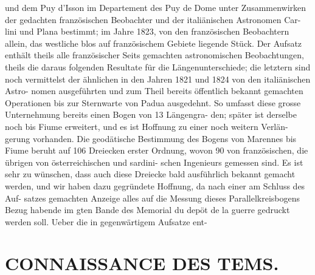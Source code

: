 \documentclass[12pt,a4paper]{article}
\begin{document}
{{{{{{{{und  dem  Puy  d'Isson  im  Departement  des  Puy  de  Dome unter  Zusammenwirken  der  gedachten  französischen  Beobachter  und  der  italiänischen  Astronomen  Car- lini und  Plana  bestimmt;  im  Jahre  1823,  von  den  französischen  Beobachtern  allein,  das  westliche  blos auf  französischem  Gebiete  liegende  Stück.  Der  Aufsatz  enthält  theils  alle  französischer  Seits  gemachten astronomischen  Beobachtungen,  theils  die  daraus  folgenden  Resultate  für  die  Längenunterschiede;  die letztern  sind  noch  vermittelst  der  ähnlichen  in  den  Jahren  1821  und  1824  von  den  italiänischen  Astro- nomen ausgeführten  und  zum  Theil  bereits  öffentlich  bekannt  gemachten  Operationen  bis  zur  Sternwarte von  Padua  ausgedehnt.  So  umfasst  diese  grosse  Unternehmung  bereits  einen  Bogen  von  13  Längengra- den; später  ist  derselbe  noch  bis  Fiume  erweitert,  und  es  ist  Hoffnung  zu  einer  noch  weitern  Verlän- gerung vorhanden.  Die  geodätische  Bestimmung  des  Bogens  von  Marennes  bis  Fiume  beruht  auf  106 Dreiecken  erster  Ordnung,  wovon  90  von  französischen,  die  übrigen  von  österreichischen  und  sardini- schen Ingenieurs  gemessen  sind.  Es  ist  sehr  zu  wünschen,  dass  auch  diese  Dreiecke  bald  ausführlich bekannt  gemacht  werden,  und  wir  haben  dazu  gegründete  Hoffnung,  da  nach  einer  am  Schluss  des  Auf- satzes gemachten  Anzeige  alles  auf  die  Messung  dieses  Parallelkreisbogens  Bezug  habende  im  gten  Bande des  Memorial  du  depöt  de  la  guerre  gedruckt  werden  soll.     Ueber  die  in  gegenwärtigem  Aufsatze  ent-


\section*{CONNAISSANCE  DES  TEMS.}

}}}}}}}}
\end{document}
